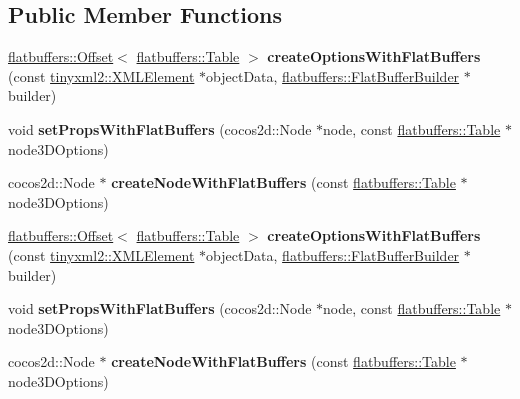\subsection*{Public Member Functions}
\begin{DoxyCompactItemize}
\item 
\mbox{\label{classcocostudio_1_1GameNode3DReader_a6f107635f4407ddcb29efe6a51e3044b}} 
\hyperlink{structflatbuffers_1_1Offset}{flatbuffers\+::\+Offset}$<$ \hyperlink{classflatbuffers_1_1Table}{flatbuffers\+::\+Table} $>$ {\bfseries create\+Options\+With\+Flat\+Buffers} (const \hyperlink{classtinyxml2_1_1XMLElement}{tinyxml2\+::\+X\+M\+L\+Element} $\ast$object\+Data, \hyperlink{classflatbuffers_1_1FlatBufferBuilder}{flatbuffers\+::\+Flat\+Buffer\+Builder} $\ast$builder)
\item 
\mbox{\label{classcocostudio_1_1GameNode3DReader_a92d7d51c2443093f3e94af59154dc931}} 
void {\bfseries set\+Props\+With\+Flat\+Buffers} (cocos2d\+::\+Node $\ast$node, const \hyperlink{classflatbuffers_1_1Table}{flatbuffers\+::\+Table} $\ast$node3\+D\+Options)
\item 
\mbox{\label{classcocostudio_1_1GameNode3DReader_ae8a42e3fa07b0491149f95e18402e902}} 
cocos2d\+::\+Node $\ast$ {\bfseries create\+Node\+With\+Flat\+Buffers} (const \hyperlink{classflatbuffers_1_1Table}{flatbuffers\+::\+Table} $\ast$node3\+D\+Options)
\item 
\mbox{\label{classcocostudio_1_1GameNode3DReader_a3272ab8560008078b956ee7d0114729e}} 
\hyperlink{structflatbuffers_1_1Offset}{flatbuffers\+::\+Offset}$<$ \hyperlink{classflatbuffers_1_1Table}{flatbuffers\+::\+Table} $>$ {\bfseries create\+Options\+With\+Flat\+Buffers} (const \hyperlink{classtinyxml2_1_1XMLElement}{tinyxml2\+::\+X\+M\+L\+Element} $\ast$object\+Data, \hyperlink{classflatbuffers_1_1FlatBufferBuilder}{flatbuffers\+::\+Flat\+Buffer\+Builder} $\ast$builder)
\item 
\mbox{\label{classcocostudio_1_1GameNode3DReader_a92d7d51c2443093f3e94af59154dc931}} 
void {\bfseries set\+Props\+With\+Flat\+Buffers} (cocos2d\+::\+Node $\ast$node, const \hyperlink{classflatbuffers_1_1Table}{flatbuffers\+::\+Table} $\ast$node3\+D\+Options)
\item 
\mbox{\label{classcocostudio_1_1GameNode3DReader_ab88a06dc1a3feb6d6f8e6b815a5aad95}} 
cocos2d\+::\+Node $\ast$ {\bfseries create\+Node\+With\+Flat\+Buffers} (const \hyperlink{classflatbuffers_1_1Table}{flatbuffers\+::\+Table} $\ast$node3\+D\+Options)
\end{DoxyCompactItemize}

